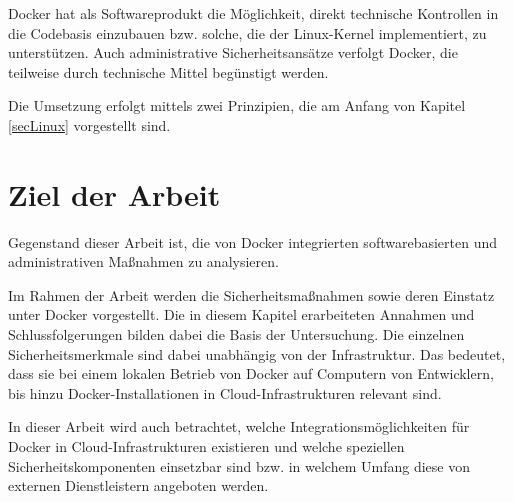 \documentclass[../main.tex]{subfiles}
\begin{document}
    Docker hat als Softwareprodukt die Möglichkeit, direkt technische Kontrollen in die Codebasis einzubauen bzw. solche, die der Linux-Kernel implementiert, zu unterstützen. Auch administrative Sicherheitsansätze verfolgt Docker, die teilweise durch technische Mittel begünstigt werden.

    Die Umsetzung erfolgt mittels zwei Prinzipien, die am Anfang von Kapitel \ref{secLinux} vorgestellt sind.

  \section{Ziel der Arbeit}
    Gegenstand dieser Arbeit ist, die von Docker integrierten softwarebasierten und administrativen Maßnahmen zu analysieren.

    Im Rahmen der Arbeit werden die Sicherheitsmaßnahmen sowie deren Einstatz unter Docker vorgestellt. Die in diesem Kapitel erarbeiteten Annahmen und Schlussfolgerungen bilden dabei die Basis der Untersuchung. Die einzelnen Sicherheitsmerkmale sind dabei unabhängig von der Infrastruktur. Das bedeutet, dass sie bei einem lokalen Betrieb von Docker auf Computern von Entwicklern, bis hinzu Docker-Installationen in Cloud-Infrastrukturen relevant sind.

    In dieser Arbeit wird auch betrachtet, welche Integrationsmöglichkeiten für Docker in Cloud-Infrastrukturen existieren und welche speziellen Sicherheitskomponenten einsetzbar sind bzw. in welchem Umfang diese von externen Dienstleistern angeboten werden.





\end{document}

